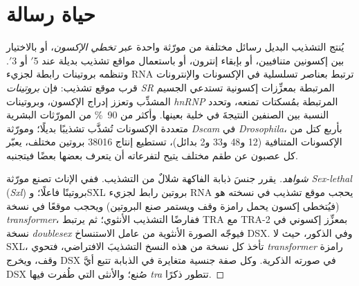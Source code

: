 \section{حياة رسالة}

\begin{definition}\label{def:b3:rna-regulation:splicing}
يُنتج التشذيب البديل رسائل مختلفة من مورّثة واحدة عبر \emph{تخطي
الإكسون}، أو بالاختيار بين إكسونين متنافيين، أو بإبقاء إنترون، أو
باستعمال مواقع تشذيب بديلة عند 5$'$ أو 3$'$. وتنظمه بروتينات رابطة
لجزيء RNA ترتبط بعناصر تسلسلية في الإكسونات والإنترونات قرب موقع تشذيب:
فإن \emph{بروتينات SR} المرتبطة بمعزِّزات إكسونية تستدعي الجسيم المشذِّب
وتعزز إدراج الإكسون، وبروتينات \emph{hnRNP} المرتبطة بمُسكتات تمنعه،
وتحدد النسبة بين الصنفين النتيجةَ في خلية بعينها. وأكثر من
\qty{90}{\%} من المورّثات البشرية متعددة الإكسونات تُشذَّب تشذيبًا
بديلًا؛ ومورّثة \emph{Dscam} في \emph{Drosophila}، بأربع كتل من
الإكسونات المتنافية (12 و48 و33 و2 بدائل)، تستطيع إنتاج \num{38016}
بروتين مختلف، يعبّر كل عصبون عن طقم مختلف يتيح لتفرعاته أن يتعرف
بعضها بعضًا فيتجنبه.
\end{definition}

\begin{proof}[شواهد]
يقرر جنسَ ذبابة الفاكهة شلالٌ من التشذيب. ففي الإناث تصنع مورّثة
\emph{Sex-lethal} (\emph{Sxl}) بروتينًا فاعلًا؛ وSXL بروتين رابط
لجزيء RNA يحجب موقع تشذيب في نسخته هو
(فيُتخطى إكسون يحمل رامزة وقف ويستمر صنع البروتين)
ويحجب موقعًا في نسخة \emph{transformer}، ففارضًا التشذيب
الأنثوي؛ ثم يرتبط TRA مع TRA-2 بمعزِّز إكسوني في نسخة
\emph{doublesex} فيوجّه الصورة الأنثوية من عامل الاستنساخ DSX. وفي
الذكور، حيث لا SXL، تأخذ كل نسخة من هذه النسخ التشذيبَ الافتراضي،
فتحوي \emph{transformer} رامزة وقف، ويخرج DSX في صورته الذكرية. وكل
صفة جنسية متغايرة في الذبابة تتبع أيَّ DSX صُنع؛ والأنثى التي طُفرت
فيها \emph{tra} تتطور ذكرًا.
\end{proof}

